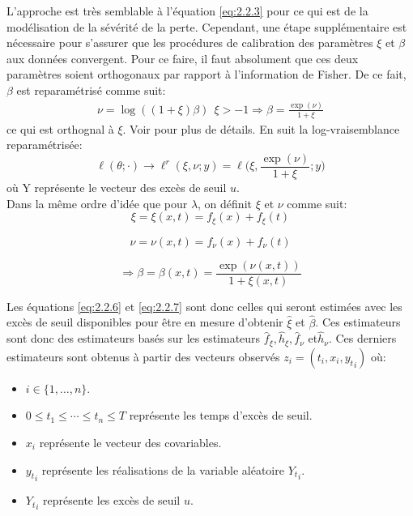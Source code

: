   L'approche est très semblable à l'équation \ref{eq:2.2.3} pour ce qui est de la modélisation de la sévérité de la perte. Cependant, une étape supplémentaire est nécessaire pour s'assurer que les procédures de calibration des paramètres $\xi$ et $\beta$ aux données convergent. Pour ce faire, il faut absolument que ces deux paramètres soient orthogonaux par rapport à l'information de Fisher. De ce fait, $\beta$ est reparamétrisé comme suit:
 \begin{equation}\label{eq:2.2.4}
 \begin{split}
  \nu = \log((1+\xi)\beta) \ \ \xi > -1
  \Rightarrow \beta = \frac{\exp(\nu)}{1+\xi}
  \end{split}
  \end{equation}
ce qui est orthognal à $\xi$. Voir \cite{cox1987parameter} pour plus de détails. En suit la log-vraisemblance reparamétrisée:
 \begin{equation}\label{eq:2.2.5}
 \ell(\theta; \cdot) \longrightarrow \ell^r(\xi, \nu; y) = \ell\Big(\xi, \frac{\exp(\nu)}{1+\xi}; y\Big)
 \end{equation}
où Y représente le vecteur des excès de seuil $u$. 
\\

Dans la même ordre d'idée que pour $\lambda$, on définit $\xi$ et $\nu$ comme suit:
\begin{equation}\label{eq:2.2.6}
 \xi = \xi(x, t) = f_\xi(x) + f_\xi(t)
\end{equation}
  
 \begin{equation}\label{eq:2.2.7}
 \nu = \nu(x, t) = f_\nu(x) + f_\nu(t)
 \end{equation}
 
  \begin{equation}\label{eq:2.2.8}
  \Rightarrow \beta = \beta(x, t) =  \frac{\exp(\nu(x,t))}{1+\xi(x,t)}
 \end{equation}

Les équations \ref{eq:2.2.6} et \ref{eq:2.2.7} sont donc celles qui seront estimées avec les excès de seuil disponibles pour être en mesure d'obtenir $\hat\xi$ et $\hat\beta$. Ces estimateurs sont donc des estimateurs basés sur les estimateurs $\hat{f}_\xi, \hat{h}_\xi, \hat{f}_\nu$ et$ \hat{h}_\nu$. Ces derniers estimateurs sont obtenus à partir des vecteurs observés $z_i = (t_i, x_i, {y_t}_{i})$ où:
\begin{itemize}
\item $i \in \{1, \dots, n\}$.
\item $0 \leq t_1 \le \cdots \le t_n \leq T$ représente les temps d'excès de seuil.
\item $x_i$ représente le vecteur des covariables.
\item ${y_t}_{i}$ représente les réalisations de la variable aléatoire ${Y_t}_{i}$.
\item ${Y_t}_{i}$ représente les excès de seuil $u$.
\end{itemize}


